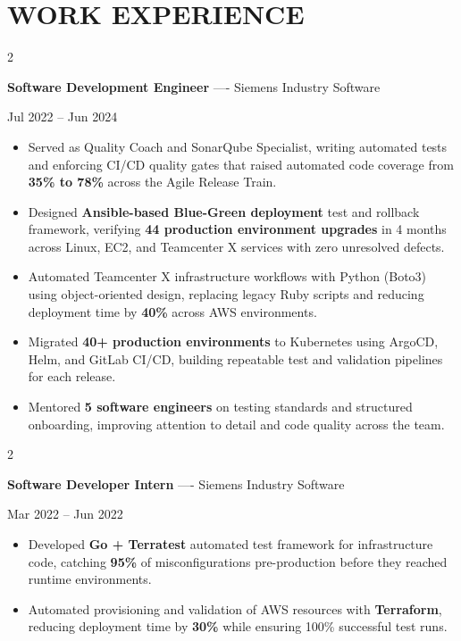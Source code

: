 \documentclass[10pt, letterpaper]{article}
\newenvironment{highlights}{
    \begin{itemize}[
        topsep=0.10 cm,
        parsep=0.06 cm,
        partopsep=0pt,
        itemsep=0.06 cm,
        leftmargin=12pt
    ]
}{
    \end{itemize}
}
\newenvironment{twocolentry}[2][]{
    \onecolentry
    \def\secondColumn{#2}
    \setcolumnwidth{\fill, 4.5 cm}
    \begin{paracol}{2}
}{
    \switchcolumn \raggedleft \secondColumn
    \end{paracol}
    \endonecolentry
}
\begin{document}
\section{WORK EXPERIENCE}
\begin{twocolentry}{Jul 2022 -- Jun 2024}
\textbf{Software Development Engineer} ---- Siemens Industry Software
\end{twocolentry}
\begin{highlights}
  \item Served as Quality Coach and SonarQube Specialist, writing automated tests and enforcing CI/CD quality gates that raised automated code coverage from \textbf{35\% to 78\%} across the Agile Release Train.
  \item Designed \textbf{Ansible-based Blue-Green deployment} test and rollback framework, verifying \textbf{44 production environment upgrades} in 4 months across Linux, EC2, and Teamcenter X services with zero unresolved defects.
  \item Automated Teamcenter X infrastructure workflows with Python (Boto3) using object-oriented design, replacing legacy Ruby scripts and reducing deployment time by \textbf{40\%} across AWS environments.
  \item Migrated \textbf{40+ production environments} to Kubernetes using ArgoCD, Helm, and GitLab CI/CD, building repeatable test and validation pipelines for each release.
  \item Mentored \textbf{5 software engineers} on testing standards and structured onboarding, improving attention to detail and code quality across the team.
\end{highlights}

\vspace{0.15 cm}

\begin{twocolentry}{Mar 2022 -- Jun 2022}
\textbf{Software Developer Intern} ---- Siemens Industry Software
\end{twocolentry}
\begin{highlights}
  \item Developed \textbf{Go + Terratest} automated test framework for infrastructure code, catching \textbf{95\%} of misconfigurations pre-production before they reached runtime environments.
  \item Automated provisioning and validation of AWS resources with \textbf{Terraform}, reducing deployment time by \textbf{30\%} while ensuring 100\% successful test runs.
\end{highlights}
\end{document}
